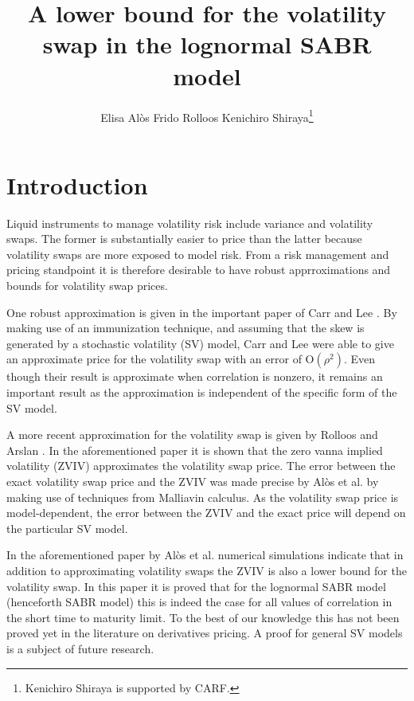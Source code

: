 \documentclass[11pt]{article}
\title{A lower bound for the volatility swap in the lognormal SABR model}
\author{Elisa Al\`os \quad Frido Rolloos \quad Kenichiro Shiraya\thanks{Kenichiro Shiraya is supported by CARF.}}
\begin{document}
\maketitle



\section{Introduction}
Liquid instruments to manage volatility risk include variance and volatility swaps. The former is substantially easier to price than the latter because volatility swaps are more exposed to model risk. From a risk management and pricing standpoint it is therefore desirable to have robust apprroximations and bounds for volatility swap prices.

\smallskip
One robust approximation is given in the important paper of Carr and Lee \cite{CL1}. By making use of an immunization technique, and assuming that the skew is generated by a stochastic volatility (SV) model, Carr and Lee were able to give an approximate price for the volatility swap with an error of $\mathrm O(\rho^2)$. Even though their result is approximate when correlation is nonzero, it remains an important result as the approximation is independent of the specific form of the SV model.

\smallskip
A more recent approximation for the volatility swap is given by Rolloos and Arslan \cite{RA}. In the aforementioned paper it is shown that the zero vanna implied volatility (ZVIV) approximates the volatility swap price. The error between the exact volatility swap price and the ZVIV was made precise by Al\`os et al. \cite{ARS} by making use of techniques from Malliavin calculus. As the volatility swap price is model-dependent, the error between the ZVIV and the exact price will depend on the particular SV model.

\smallskip
In the aforementioned paper by Al\`os et al. numerical simulations indicate that in addition to approximating volatility swaps the ZVIV is also a lower bound for the volatility swap. In this paper it is proved that for the lognormal SABR model (henceforth SABR model) this is indeed the case for all values of correlation in the short time to maturity limit. To the best of our knowledge this has not been proved yet in the literature on derivatives pricing. A proof for general SV models is a subject of future research.
\end{document}

